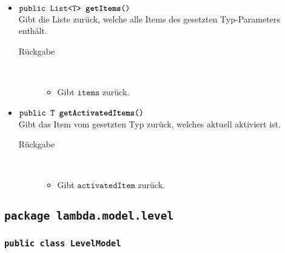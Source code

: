 \begin{description}
\begin{itemize}
		\item $\texttt{public List<T> \textbf{getItems}()}$ \\ Gibt die Liste zurück, welche alle Items des gesetzten Typ-Parameters enthält.
		\begin{description}
			\item[Rückgabe] \hfill \\
			\vspace{-.8cm}
			\begin{itemize}
				\item Gibt $\texttt{items}$ zurück.
			\end{itemize}
			\end{description}
			
		\item $\texttt{public T \textbf{getActivatedItems}()}$ \\ Gibt das Item vom gesetzten Typ zurück, welches aktuell aktiviert ist.
		\begin{description}
			\item[Rückgabe] \hfill \\
			\vspace{-.8cm}
			\begin{itemize}
				\item Gibt $\texttt{activatedItem}$ zurück.
			\end{itemize}
			\end{description}

	\end{itemize}
\end{description}


\subsection{\texttt{package lambda.model.level}}

\subsubsection{\normalfont \texttt{public class \textbf{LevelModel}}}

